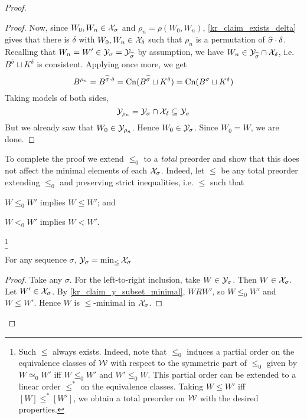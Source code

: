 \begin{proof}
\begin{proof}
        Now, since $W_0, W_n \in \mathcal{X}_\sigma$ and $\rho_n = \rho(W_0, W_n)$,
        \cref{kr_claim_exists_delta} gives that there is $\delta$ with $W_0, W_n
        \in \mathcal{X}_{\delta}$ such that $\rho_n$ is a permutation of
        $\widehat{\sigma} \cdot \delta$. Recalling that $W_n = W' \in
        \mathcal{Y}_\sigma = \mathcal{Y}_{\widehat{\sigma}}$ by assumption, we have $W_n \in
        \mathcal{Y}_{\widehat{\sigma}} \cap \mathcal{X}_\delta$, i.e. $B^{\widehat{\sigma}}
        \sqcup K^\delta$ is consistent. Applying \incvac{} once
        more, we get
        \[
            B^{\rho_n}
            = B^{\widehat{\sigma} \cdot \delta}
            = \operatorname{Cn}(B^{\widehat{\sigma}} \sqcup K^\delta)
            = \operatorname{Cn}(B^{\sigma} \sqcup K^\delta)
        \]
        Taking models of both sides,
        \[
            \mathcal{Y}_{\rho_n} = \mathcal{Y}_{\sigma} \cap \mathcal{X}_\delta \subseteq \mathcal{Y}_\sigma
        \]
        But we already saw that $W_0 \in \mathcal{Y}_{\rho_n}$. Hence $W_0 \in
        \mathcal{Y}_\sigma$. Since $W_0 = W$, we are done.
    \end{proof}

To complete the proof we extend $\le_0$ to a \emph{total} preorder and show
that this does not affect the minimal elements of each $\mathcal{X}_\sigma$. Indeed, let
$\le$ be any total preorder extending $\le_0$ and preserving strict
inequalities, i.e. $\le$ such that
\begin{inlinelist}
    \item $W \le_0 W'$ implies $W \le W'$; and
    \item\label{kr_item_strict_ineq_preserved} $W <_0 W'$ implies $W < W'$.
\end{inlinelist}\footnote{
    Such $\le$ always exists. Indeed, note that $\le_0$ induces a partial order
    on the equivalence classes of $\mathcal{W}$ with respect to the symmetric part of
    $\le_0$ given by $W \simeq_0 W'$ iff $W \le_0 W'$ and $W' \le_0 W$. This
    partial order can be extended to a linear order $\le^*$ on the equivalence
    classes. Taking $W \le W'$ iff $[W]  \le^* [W']$, we obtain a total
    preorder on $\mathcal{W}$ with the desired properties.
}

    \begin{claim}
        For any sequence $\sigma$, $\mathcal{Y}_\sigma = \min_{\le}{\mathcal{X}_\sigma}$
    \end{claim}
    \begin{proof}
        Take any $\sigma$. For the left-to-right inclusion, take $W \in
        \mathcal{Y}_\sigma$. Then $W \in \mathcal{X}_\sigma$. Let $W' \in \mathcal{X}_\sigma$. By
        \cref{kr_claim_y_subset_minimal}, $W R W'$, so $W \le_0 W'$ and $W \le
        W'$. Hence $W$ is $\le$-minimal in $\mathcal{X}_\sigma$.


\end{proof}
\end{proof}
